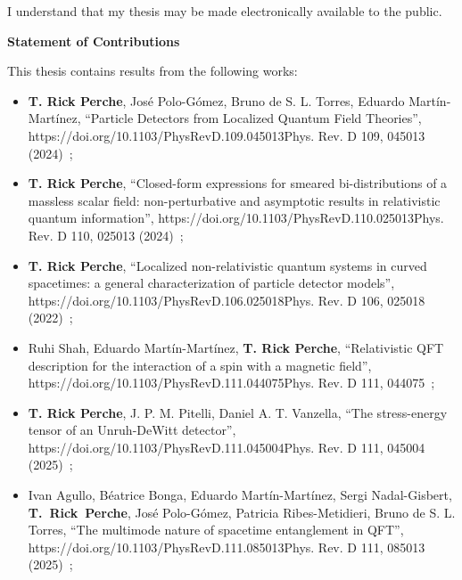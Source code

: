 \documentclass[letterpaper,12pt,titlepage,oneside,final]{book}
\newcommand{\href}[1]{#1} %
\let\origdoublepage\cleardoublepage
\newcommand{\clearemptydoublepage}{%
  \clearpage{\pagestyle{empty}\origdoublepage}}
\let\cleardoublepage\clearemptydoublepage
\begin{document}
  \noindent
I understand that my thesis may be made electronically available to the public.

\cleardoublepage
{}    %

\begin{center}\textbf{Statement of Contributions}\end{center}

\noindent This thesis contains results from the following works:

\begin{itemize}
    \item[(1)] \textbf{T. Rick Perche}, José Polo-Gómez, Bruno de S. L. Torres, Eduardo Martín-Martínez, ``Particle Detectors from Localized Quantum Field Theories'', \href{https://doi.org/10.1103/PhysRevD.109.045013}{Phys. Rev. D 109, 045013 (2024)}~\cite{QFTPD};
    \item[(2)] \textbf{T. Rick Perche}, ``Closed-form expressions for smeared bi-distributions of a massless scalar field: non-perturbative and asymptotic results in relativistic quantum information'', \href{https://doi.org/10.1103/PhysRevD.110.025013}{Phys. Rev. D 110, 025013 (2024)}~\cite{analytical};
    \item[(3)] \textbf{T. Rick Perche}, ``Localized non-relativistic quantum systems in curved spacetimes: a general characterization of particle detector models'', \href{https://doi.org/10.1103/PhysRevD.106.025018}{Phys. Rev. D 106, 025018 (2022)}~\cite{generalPD};
    \item[(4)] Ruhi Shah, Eduardo Martín-Martínez, \textbf{T. Rick Perche}, ``Relativistic QFT description for the interaction of a spin with a magnetic field'', \href{https://doi.org/10.1103/PhysRevD.111.044075}{Phys. Rev. D 111, 044075}~\cite{ruhi};
    \item[(5)] \textbf{T. Rick Perche}, J. P. M. Pitelli, Daniel A. T. Vanzella, ``The stress-energy tensor of an Unruh-DeWitt detector'', \href{https://doi.org/10.1103/PhysRevD.111.045004}{Phys. Rev. D 111, 045004 (2025)}~\cite{TmunuUDW};
    \item[(6)] Ivan Agullo, Béatrice Bonga, Eduardo Martín-Martínez, Sergi Nadal-Gisbert, \\\mbox{\textbf{T. Rick Perche}}, José Polo-Gómez, Patricia Ribes-Metidieri, Bruno de S. L. Torres, ``The multimode nature of spacetime entanglement in QFT'', \href{https://doi.org/10.1103/PhysRevD.111.085013}{Phys. Rev. D 111, 085013 (2025)}~\cite{patriciaAndI};

\end{itemize}
\end{document}
